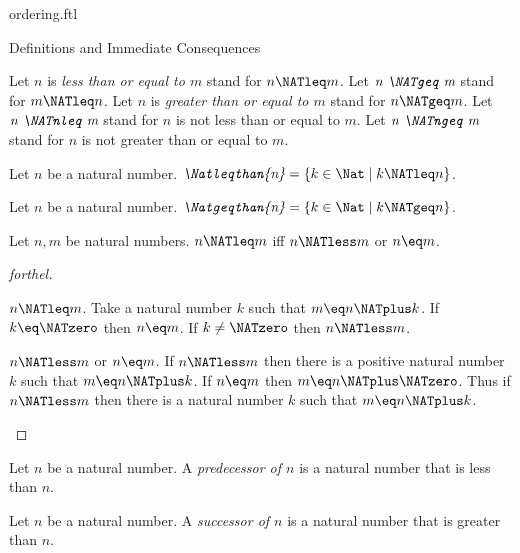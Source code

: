 \documentclass{naproche-library}
\begin{document}
\begin{smodule}[title=The Standard Ordering of the Natural Numbers]{ordering.ftl}
\begin{sfragment}{Definitions and Immediate Consequences}
\begin{definition}[forthel,id=ARITHMETIC_04_4593841531256832]
    Let $n$ is \emph{less than or equal to $m$} stand for $n \NATleq m$.
    Let $\emph{n \NATgeq m}$ stand for $m \NATleq n$.
    Let $n$ is \emph{greater than or equal to $m$} stand for $n \NATgeq m$.
    Let $\emph{n \NATnleq m}$ stand for $n$ is not less than or equal to $m$.
    Let $\emph{n \NATngeq m}$ stand for $n$ is not greater than or equal to $m$.
  \end{definition}

  \begin{definition}[forthel,id=ARITHMETIC_04_72501526790144]
    Let $n$ be a natural number.
    $\emph{\Natleqthan{n}} = \{ k \in \Nat \mid k \NATleq n \}$.
  \end{definition}

  \begin{definition}[forthel,id=ARITHMETIC_04_1706933421604864]
    Let $n$ be a natural number.
    $\emph{\Natgeqthan{n}} = \{ k \in \Nat \mid k \NATgeq n \}$.
  \end{definition}

  \begin{proposition}[forthel,id=ARITHMETIC_04_5385415374667776]
    Let $n, m$ be natural numbers.
    $n \NATleq m$ iff $n \NATless m$ or $n \eq m$.
  \end{proposition}
  \begin{proof}[forthel]
    \begin{case}{$n \NATleq m$.}
      Take a natural number $k$ such that $m \eq n \NATplus k$.
      If $k \eq \NATzero$ then $n \eq m$. If $k \neq \NATzero$ then $n \NATless m$.
    \end{case}

    \begin{case}{$n \NATless m$ or $n \eq m$.}
      If $n \NATless m$ then there is a positive natural number $k$ such that $m \eq n \NATplus k$.
      If $n \eq m$ then $m \eq n \NATplus \NATzero$.
      Thus if $n \NATless m$ then there is a natural number $k$ such that $m \eq n \NATplus k$.
    \end{case}
  \end{proof}

  \begin{definition}[forthel,id=ARITHMETIC_04_6232154608500736]
    Let $n$ be a natural number.
    A \emph{predecessor of $n$} is a natural number that is less than $n$.
  \end{definition}

  \begin{definition}[forthel,id=ARITHMETIC_04_8147686326796288]
    Let $n$ be a natural number.
    A \emph{successor of $n$} is a natural number that is greater than $n$.
  \end{definition}


\end{sfragment}
\end{smodule}
\end{document}
